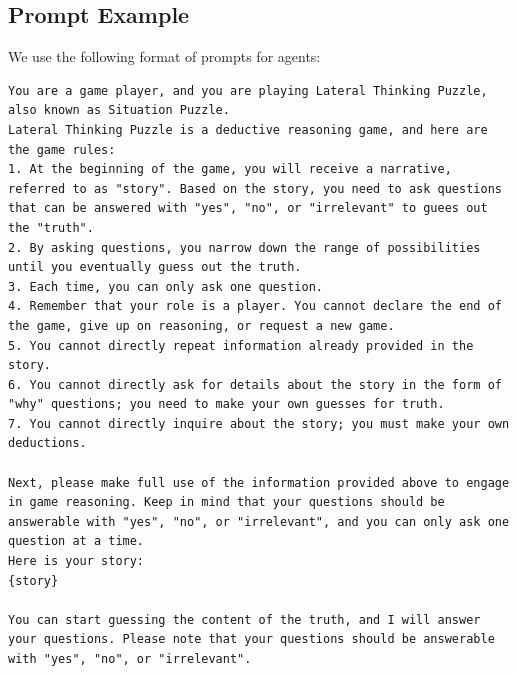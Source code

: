 \subsection{Prompt Example}
We use the following format of prompts for agents:
\begin{lstlisting}
You are a game player, and you are playing Lateral Thinking Puzzle, also known as Situation Puzzle.
Lateral Thinking Puzzle is a deductive reasoning game, and here are the game rules:
1. At the beginning of the game, you will receive a narrative, referred to as "story". Based on the story, you need to ask questions that can be answered with "yes", "no", or "irrelevant" to guees out the "truth".
2. By asking questions, you narrow down the range of possibilities until you eventually guess out the truth.
3. Each time, you can only ask one question.
4. Remember that your role is a player. You cannot declare the end of the game, give up on reasoning, or request a new game.
5. You cannot directly repeat information already provided in the story.
6. You cannot directly ask for details about the story in the form of "why" questions; you need to make your own guesses for truth.
7. You cannot directly inquire about the story; you must make your own deductions.

Next, please make full use of the information provided above to engage in game reasoning. Keep in mind that your questions should be answerable with "yes", "no", or "irrelevant", and you can only ask one question at a time.
Here is your story:
{story}

You can start guessing the content of the truth, and I will answer your questions. Please note that your questions should be answerable with "yes", "no", or "irrelevant".
\end{lstlisting}

